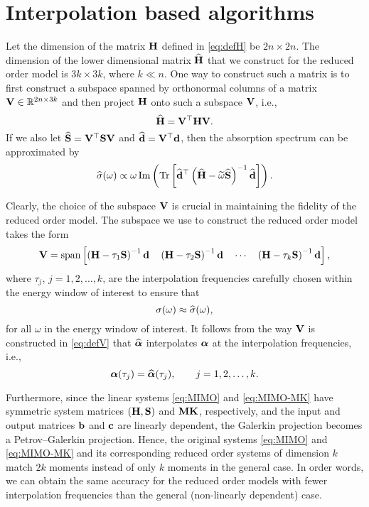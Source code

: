 \section{Interpolation based algorithms}
\label{sec:mor}

Let the dimension of the matrix $\mathbf{H}$ defined in \eqref{eq:defH} be $2n \times 2n$. The dimension of the lower dimensional matrix $\widehat{\mathbf{H}}$ that we construct for the reduced order model is $3k \times 3k$, where $k \ll n$. One way to construct such a matrix is to first construct a subspace spanned by orthonormal columns of a matrix $\bV \inR[2n][3k]$ and then project $\mathbf{H}$ onto such a subspace $\mathbf{V}$, i.e.,
\begin{equation}
  \widehat{\mathbf{H}} = \mathbf{V}^\top \mathbf{H} \mathbf{V}.
\end{equation}
If we also let $\widehat{\mathbf{S}} = \mathbf{V}^\top \mathbf{S} \mathbf{V}$ and $\widehat{\mathbf{d}} = \mathbf{V}^\top \mathbf{d}$, then the absorption spectrum can be approximated by
\begin{equation}
  \widehat{\sigma}(\omega) \propto \omega \operatorname{Im}\left(\operatorname{Tr}\left[ \widehat{\mathbf{d}}^\top \left( \widehat{\mathbf{H}} - \widetilde{\omega}\widehat{\mathbf{S}} \right)^{-1} \widehat{\mathbf{d}} \right]\right).
  \label{eq:abs-spectrum-k}
\end{equation}

Clearly, the choice of the subspace $\mathbf{V}$ is crucial in maintaining the 
fidelity of the reduced order model.  The subspace we use to construct the reduced order model takes the form
\begin{equation}
  \mathbf{V} = \mathrm{span}\left[ \left( \mathbf{H} - \tau_1\mathbf{S} \right)^{-1} \mathbf{d} \quad \left( \mathbf{H} - \tau_2\mathbf{S} \right)^{-1} \mathbf{d} \quad \cdots \quad \left( \mathbf{H} - \tau_k\mathbf{S} \right)^{-1} \mathbf{d}  \right],
  \label{eq:defV}
\end{equation}
where $\tau_j$, $j = 1,2,\ldots,k$, are the interpolation frequencies carefully 
chosen within the energy window of interest to ensure that
\begin{equation}
  \sigma(\omega) \approx \widehat{\sigma}(\omega),
\end{equation}
for all $\omega$ in the energy window of interest. It follows from the way $\mathbf{V}$ is constructed in \eqref{eq:defV} that $\widehat{\boldsymbol{\alpha}}$ interpolates $\boldsymbol{\alpha}$ at the interpolation frequencies, i.e.,
\begin{equation}
  \boldsymbol{\alpha}(\tau_j) = \widehat{\boldsymbol{\alpha}}(\tau_j), \qquad j = 1,2,\ldots,k.
\end{equation}

Furthermore, since the linear systems \eqref{eq:MIMO} and \eqref{eq:MIMO-MK} have symmetric system matrices $(\mathbf{H},\mathbf{S})$ and $\mathbf{M}\mathbf{K}$, respectively, and the input and output matrices $\mathbf{b}$ and $\mathbf{c}$ are linearly dependent, the Galerkin projection becomes a Petrov--Galerkin projection\cite{Antoulas2005}. Hence, the original systems \eqref{eq:MIMO} and \eqref{eq:MIMO-MK} and its corresponding reduced order systems of dimension $k$ match $2k$ moments instead of only $k$ moments in the general case\cite{Antoulas2005}. In order words, we can obtain the same accuracy for the reduced order models with fewer interpolation frequencies than the general (non-linearly dependent) case.

